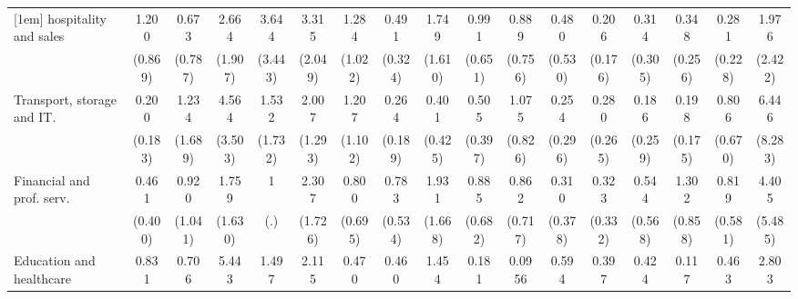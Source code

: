 {\begin{tabular}{l*{16}{c}}
[1em]
hospitality and sales&       1.200         &       0.673         &       2.664         &       3.644         &       3.315         &       1.284         &       0.491         &       1.749         &       0.991         &       0.889         &       0.480         &       0.206         &       0.314         &       0.348         &       0.281         &       1.976         \\
                    &     (0.869)         &     (0.787)         &     (1.907)         &     (3.443)         &     (2.049)         &     (1.022)         &     (0.324)         &     (1.610)         &     (0.651)         &     (0.756)         &     (0.530)         &     (0.176)         &     (0.305)         &     (0.256)         &     (0.228)         &     (2.422)         \\
[1em]
Transport, storage and IT.&       0.200         &       1.234         &       4.564\sym{*}  &       1.532         &       2.007         &       1.207         &       0.264         &       0.401         &       0.505         &       1.075         &       0.254         &       0.280         &       0.186         &       0.198         &       0.806         &       6.446         \\
                    &     (0.183)         &     (1.689)         &     (3.503)         &     (1.732)         &     (1.293)         &     (1.102)         &     (0.189)         &     (0.425)         &     (0.397)         &     (0.826)         &     (0.296)         &     (0.265)         &     (0.259)         &     (0.175)         &     (0.670)         &     (8.283)         \\
[1em]
Financial and prof. serv.&       0.461         &       0.920         &       1.759         &           1         &       2.307         &       0.800         &       0.783         &       1.931         &       0.885         &       0.862         &       0.310         &       0.323         &       0.544         &       1.302         &       0.819         &       4.405         \\
                    &     (0.400)         &     (1.041)         &     (1.630)         &         (.)         &     (1.726)         &     (0.695)         &     (0.534)         &     (1.668)         &     (0.682)         &     (0.717)         &     (0.378)         &     (0.332)         &     (0.568)         &     (0.858)         &     (0.581)         &     (5.485)         \\
[1em]
Education and healthcare&       0.831         &       0.706         &       5.443\sym{*}  &       1.497         &       2.115         &       0.470         &       0.460         &       1.454         &       0.181         &      0.0956\sym{*}  &       0.594         &       0.397         &       0.424         &       0.117\sym{*}  &       0.463         &       2.803         \\

\end{tabular}}
